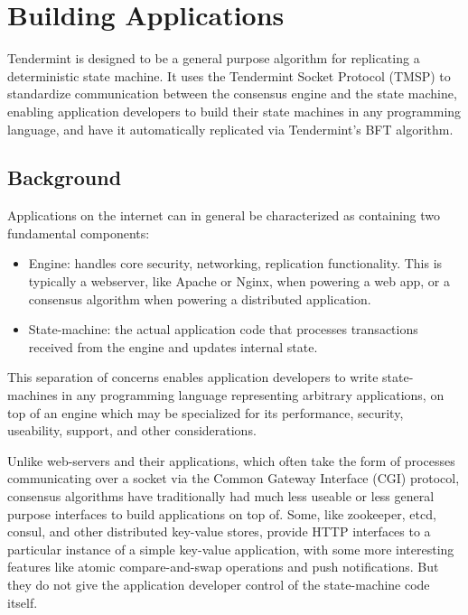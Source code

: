 \chapter{Building Applications}
\label{ch:apps}

Tendermint is designed to be a general purpose algorithm for replicating a deterministic state machine.
It uses the Tendermint Socket Protocol (TMSP) to standardize communication between the consensus engine and the state machine,
enabling application developers to build their state machines in any programming language, 
and have it automatically replicated via Tendermint's BFT algorithm.

\section{Background}

Applications on the internet can in general be characterized as containing two fundamental components:

\begin{itemize}
\item{Engine: handles core security, networking, replication
    functionality. This is typically a webserver, like Apache or Nginx, when powering a web app, or a consensus algorithm when powering a distributed application.}
\item{State-machine: the actual application code that processes transactions received from the engine  and updates internal state.}
\end{itemize}

This separation of concerns enables application developers to write state-machines in any programming language representing arbitrary applications,
on top of an engine which may be specialized for its performance, security, useability, support, and other considerations.

Unlike web-servers and their applications, which often take the form of processes communicating over a socket via the Common Gateway Interface (CGI) protocol,
consensus algorithms have traditionally had much less useable or less general purpose interfaces to build applications on top of.
Some, like zookeeper, etcd, consul, and other distributed key-value stores, 
provide HTTP interfaces to a particular instance of a simple key-value application, 
with some more interesting features like atomic compare-and-swap operations and push notifications.
But they do not give the application developer control of the state-machine code itself.

